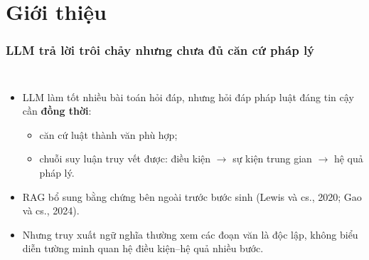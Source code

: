 \section{Giới thiệu}

\begin{frame}
\frametitle{LLM trả lời trôi chảy nhưng chưa đủ căn cứ pháp lý}
\begin{columns}[T,onlytextwidth]
\small
\begin{itemize}
  \item LLM làm tốt nhiều bài toán hỏi đáp, nhưng hỏi đáp pháp luật
        đáng tin cậy cần \textbf{đồng thời}:
  \begin{itemize}
    \item căn cứ luật thành văn phù hợp;
    \item chuỗi suy luận truy vết được: điều kiện $\rightarrow$
          sự kiện trung gian $\rightarrow$ hệ quả pháp lý.
  \end{itemize}
  \item RAG bổ sung bằng chứng bên ngoài trước bước sinh
        {\color{schemaGray}(Lewis và cs., 2020; Gao và cs., 2024)}.
  \item Nhưng truy xuất ngữ nghĩa thường xem các đoạn văn là
        \alert{độc lập}, không biểu diễn tường minh quan hệ
        điều kiện--hệ quả nhiều bước.
\end{itemize}


\end{columns}
\end{frame}
